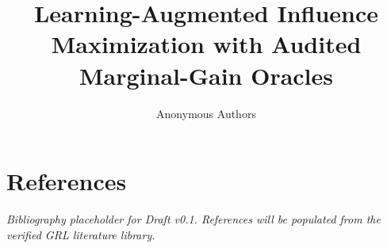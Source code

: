\documentclass{article}
\title{Learning-Augmented Influence Maximization with Audited Marginal-Gain Oracles}
\author{Anonymous Authors}
\begin{document}
\maketitle










% 
% 
\section*{References}
\textit{Bibliography placeholder for Draft v0.1. References will be populated from the verified GRL literature library.}

\appendix

\end{document}
